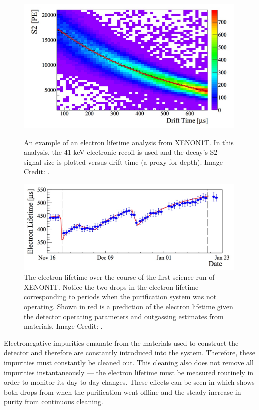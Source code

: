\begin{figure}[p]
	\centering
	\includegraphics[width=0.99\textwidth]{../../Chapter2/images/tpc_electron_lifetime.jpeg}
	\caption{An example of an electron lifetime analysis from XENON1T.  In this analysis, the 41 keV  electronic recoil is used and the decay's S2 signal size is plotted versus drift time (a proxy for depth).  Image Credit: .}
	\label{fig:xe1t_electron_lifetime}
	
	\centering
	\includegraphics[width=0.99\textwidth]{xe1t_electron_lifetime_sr0}
	\caption{The electron lifetime over the course of the first science run of XENON1T.  Notice the two drops in the electron lifetime corresponding to periods when the purification system was not operating.  Shown in red is a prediction of the electron lifetime given the detector operating parameters and outgassing estimates from materials.  Image Credit: .}
	\label{fig:xe1t_electron_lifetime_sr0}
\end{figure}


Electronegative impurities emanate from the materials used to construct the detector and therefore are constantly introduced into the system.  Therefore, these impurities must constantly be cleaned out.  This cleaning also does not remove all impurities instantaneously --- the electron lifetime must be measured routinely in order to monitor its day-to-day changes.  These effects can be seen in  which shows both drops from when the purification went offline and the steady increase in purity from continuous cleaning.


